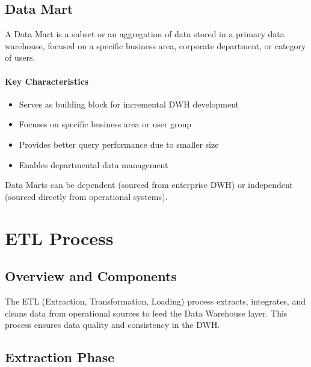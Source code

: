 \documentclass[a4paper,11pt]{article}
\newcommand{\definition}[1]{
  \begin{tcolorbox}[colback=blue!5,colframe=blue!40!black,title=Definition]
    #1
  \end{tcolorbox}
}
\newcommand{\note}[1]{
  \begin{tcolorbox}[colback=green!5,colframe=green!40!black,title=Note]
    #1
  \end{tcolorbox}
}
\begin{document}
\subsection{Data Mart}
\definition{
A Data Mart is a subset or an aggregation of data stored in a primary data warehouse, focused on a specific business area, corporate department, or category of users.
}

\paragraph{Key Characteristics}
\begin{itemize}
    \item Serves as building block for incremental DWH development
    \item Focuses on specific business area or user group
    \item Provides better query performance due to smaller size
    \item Enables departmental data management
\end{itemize}

\note{
Data Marts can be dependent (sourced from enterprise DWH) or independent (sourced directly from operational systems).
}

\section{ETL Process}

\subsection{Overview and Components}
\definition{
The ETL (Extraction, Transformation, Loading) process extracts, integrates, and cleans data from operational sources to feed the Data Warehouse layer. This process ensures data quality and consistency in the DWH.
}

\subsection{Extraction Phase}
\end{document}
